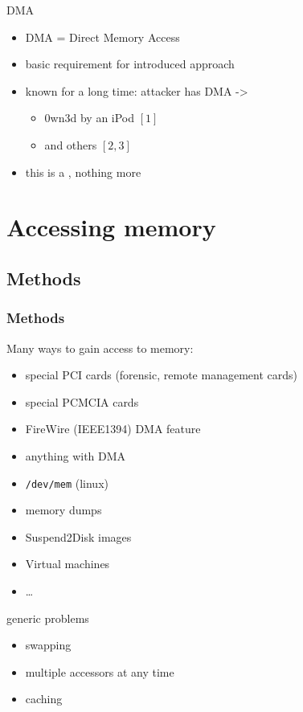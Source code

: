 \documentclass{beamer}
\newenvironment{itemizeframe}[1]
  {\begin{frame}{#1}\startitemizeframe}
  {\stopitemizeframe\end{frame}}
\newcommand\startitemizeframe{\begin{itemize}}
\newcommand\stopitemizeframe{\end{itemize}}
\begin{document}
		\begin{itemizeframe}{DMA}
			\item DMA = Direct Memory Access
			\item basic requirement for introduced approach
			\item known for a long time: attacker has DMA -> 
				\begin{itemize}
					\item 0wn3d by an iPod $[1]$
					\item and others $[2,3]$
				\end{itemize}
			\item this is a , nothing more
		\end{itemizeframe}

\section{Accessing memory}

	\subsection{Methods}

		\begin{frame} \frametitle{Methods}
			Many ways to gain access to memory:
			\begin{itemize}
				\item special PCI cards (forensic, remote management cards)
				\item special PCMCIA cards
				\item FireWire (IEEE1394) DMA feature
				\item anything with DMA
				\item \texttt{/dev/mem} (linux)
				\item memory dumps
				\item Suspend2Disk images
				\item Virtual machines
				\item \ldots
			\end{itemize}
		\end{frame}

		\begin{itemizeframe}{generic problems}
			\item swapping
			\item multiple accessors at any time
			\item caching
		\end{itemizeframe}
\end{document}
